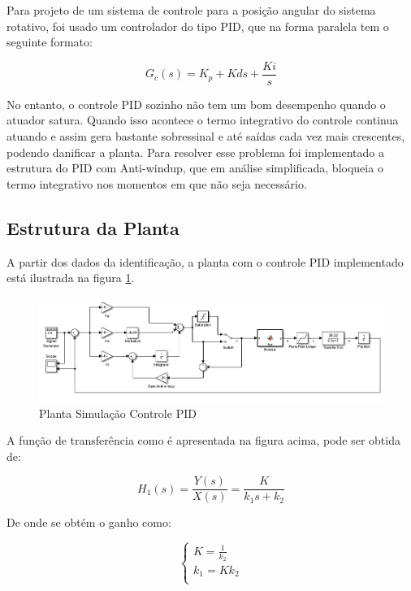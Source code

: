 \documentclass[a4paper,11pt]{article}
\begin{document}
Para projeto de um sistema de controle para a posição angular do sistema rotativo, foi usado um controlador do tipo PID, que na forma paralela tem o seguinte formato:

\begin{equation}
    G_c(s) = K_p + Kd s + \frac{Ki}{s}
\end{equation}

No entanto, o controle PID sozinho não tem um bom desempenho quando o atuador satura. Quando isso acontece o termo integrativo do controle continua atuando e assim gera bastante sobressinal e até saídas cada vez mais crescentes, podendo danificar a planta. Para resolver esse problema foi implementado a estrutura do PID com Anti-windup, que em análise simplificada, bloqueia o termo integrativo nos momentos em que não seja necessário.


\subsection{Estrutura da Planta}

A partir dos dados da identificação, a planta com o controle PID implementado está ilustrada na figura \ref{fig:planta_PID}.

\begin{figure}[H]
    \centering
    \includegraphics[width=1.0\linewidth]{tex/img/Planta_PID.png}
    \caption{Planta Simulação Controle PID}
    \label{fig:planta_PID}
\end{figure}
A função de transferência como é apresentada na figura acima, pode ser obtida de:

\begin{equation}\label{eq:firstordertf1}
    H_1(s) = \frac{Y(s)}{X(s)} = \frac{K}{k_1 s+ k_2}
\end{equation}

De onde se obtém o ganho como:

\begin{equation}
    \left\{\begin{array}{c}
    K = \frac{1}{k_2} \\
    k_1 = Kk_2 \\
\end{array} \right.
\end{equation}
\end{document}

